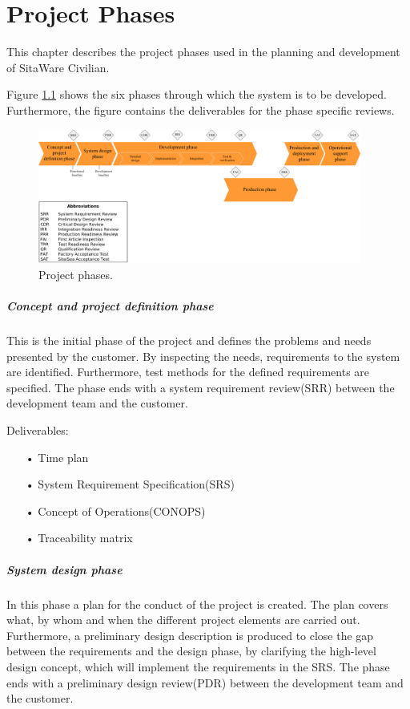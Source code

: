 \chapter{Project Phases}
\label{chap:phases}

This chapter describes the project phases used in the planning and development of SitaWare Civilian.

Figure \ref{fig:project_phases} shows the six phases through which the system is to be developed. Furthermore, the figure contains the deliverables for the phase specific reviews. 

\begin{figure}[H]
\centering
\includegraphics[width=0.95\textwidth]
{Billeder/project_phases/project_phases.PNG}
\caption{Project phases.}
\label{fig:project_phases}
\end{figure}


\paragraph{Concept and project definition phase}
This is the initial phase of the project and defines the problems and needs presented by the customer. By inspecting the needs, requirements to the system are identified. Furthermore, test methods for the defined requirements are specified. The phase ends with a system requirement review(SRR) between the development team and the customer. 

Deliverables:
\begin{enumerate}
\item[•] Time plan
\item[•] System Requirement Specification(SRS)
\item[•] Concept of Operations(CONOPS)
\item[•] Traceability matrix
\end{enumerate}


\paragraph{System design phase}
In this phase a plan for the conduct of the project is created. The plan covers what, by whom and when the different project elements are carried out. Furthermore, a preliminary design description is produced to close the gap between the requirements and the design phase, by clarifying the high-level design concept, which will implement the requirements in the SRS. The phase ends with a preliminary design review(PDR) between the development team and the customer. 

